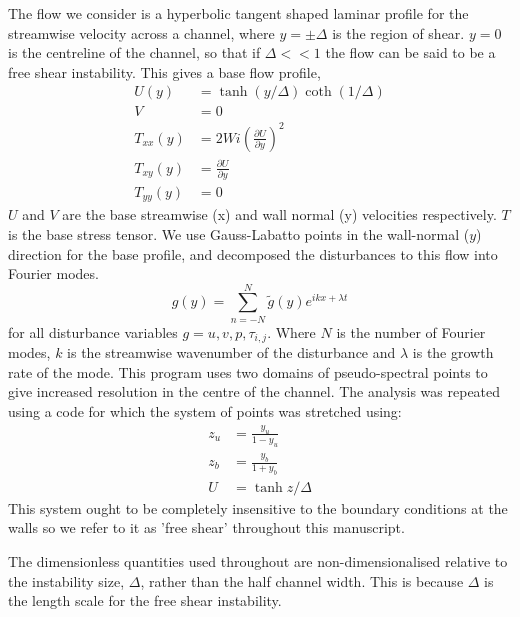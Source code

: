 \documentclass{jfm}
\newcommand{\dy}[1]{\frac{\partial #1}{\partial y}}
\begin{document}
The flow we consider is a hyperbolic tangent shaped laminar profile for the
streamwise velocity across a channel, where $y = \pm \Delta$ is the region of
shear. $y=0$ is the centreline of the channel, so that if $\Delta << 1$ the
flow can be said to be a free shear instability.  This gives a base flow
profile, 
\begin{align} 
    U(y) &= \tanh \left( y/\Delta
    \right) \coth \left( 1/\Delta \right) \nonumber\\ V &= 0 \nonumber \\
    T_{xx}(y) &= 2 Wi \left( \dy{U} \right)^{2} \nonumber \\ T_{xy}(y) &=
    \dy{U} \nonumber \\ T_{yy}(y) &= 0 \label{eq:KH_laminar_profile}
\end{align}
$U$ and $V$ are the base streamwise (x) and wall normal (y) velocities
respectively. $T$ is the base stress tensor. We use Gauss-Labatto points in the
wall-normal ($y$) direction for the base profile, and decomposed the
disturbances to this flow into Fourier modes.  
\begin{equation} 
    g(y) = \sum\limits_{n=-N}^{N} \widetilde{g}(y) e^{ikx + \lambda t} 
\end{equation}
for all disturbance variables $g = u, v, p, \tau_{i,j}$. Where $N$ is the
number of Fourier modes, $k$ is the streamwise wavenumber of the disturbance
and $\lambda$ is the growth rate of the mode. This program uses two domains of
pseudo-spectral points to give increased resolution in the centre of the
channel. The analysis was repeated using a code for which the system of points
was stretched using: 
\begin{align} 
    z_{u} &= \frac{y_{u}}{1-y_{u}} \\
    z_{b} &= \frac{y_{b}}{1+y_{b}} \\ U     &= \tanh{z/\Delta}
    \label{eq:KH_inf_profile} 
\end{align} 
This system ought to be completely insensitive to the boundary conditions at
the walls so we refer to it as 'free shear' throughout this manuscript. 

The dimensionless quantities used throughout are non-dimensionalised relative
to the instability size, $\Delta$, rather than the half channel width. This is
because $\Delta$ is the length scale for the free shear instability.
\end{document}

